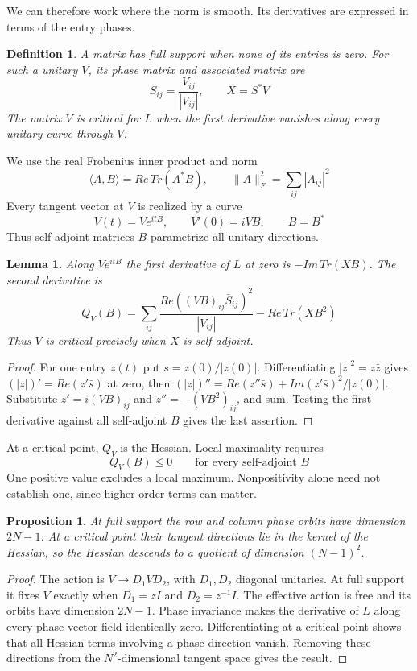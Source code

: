 \documentclass[11pt,a4paper]{article}
\newtheorem{prop}[thm]{Proposition}
\newtheorem{lem}[thm]{Lemma}
\newtheorem{defn}[thm]{Definition}
\begin{document}
We can therefore work where the norm is smooth. Its derivatives are
expressed in terms of the entry phases.

\begin{defn}
A matrix has full support when none of its entries is zero. For such
a unitary $V$, its phase matrix and associated matrix are
\[
 S_{ij}=\frac{V_{ij}}{|V_{ij}|},\qquad X=S^*V
\]
The matrix $V$ is critical for $L$ when the first derivative vanishes
along every unitary curve through $V$.
\end{defn}

We use the real Frobenius inner product and norm
\[
 \langle A,B\rangle=Re\,Tr(A^*B),\qquad
 \|A\|_F^2=\sum_{ij}|A_{ij}|^2
\]
Every tangent vector at $V$ is realized by a curve
\[
 V(t)=Ve^{itB},\qquad V'(0)=iVB,\qquad B=B^*
\]
Thus self-adjoint matrices $B$ parametrize all unitary directions.

\begin{lem}\label{variations}
Along $V e^{itB}$ the first derivative of $L$ at zero is
$-Im\,Tr(XB)$. The second derivative is
\[
 Q_V(B)=\sum_{ij}\frac{Re((VB)_{ij}\bar S_{ij})^2}
 {|V_{ij}|}-Re\,Tr(XB^2)
\]
Thus $V$ is critical precisely when $X$ is self-adjoint.
\end{lem}
\begin{proof}
For one entry $z(t)$ put $s=z(0)/|z(0)|$. Differentiating $|z|^2=z\bar z$
gives $(|z|)'=Re(z'\bar s)$ at zero, then
$(|z|)''=Re(z''\bar s)+Im(z'\bar s)^2/|z(0)|$.
Substitute $z'=i(VB)_{ij}$ and $z''=-(VB^2)_{ij}$, and sum. Testing
the first derivative against all self-adjoint $B$ gives the last assertion.
\end{proof}

At a critical point, $Q_V$ is the Hessian. Local maximality requires
\[
 Q_V(B)\le0\qquad\text{for every self-adjoint }B
\]
One positive value excludes a local maximum. Nonpositivity alone need
not establish one, since higher-order terms can matter.

\begin{prop}\label{phasequotient}
At full support the row and column phase orbits have dimension $2N-1$.
At a critical point their tangent directions lie in the kernel of the
Hessian, so the Hessian descends to a quotient of dimension $(N-1)^2$.
\end{prop}
\begin{proof}
The action is $V\to D_1VD_2$, with $D_1,D_2$ diagonal unitaries.
At full support it fixes $V$ exactly when $D_1=zI$ and $D_2=z^{-1}I$.
The effective action is free and its orbits have dimension $2N-1$.
Phase invariance makes the derivative of $L$ along every phase vector
field identically zero. Differentiating at a critical point shows that
all Hessian terms involving a phase direction vanish. Removing these
directions from the $N^2$-dimensional tangent space gives the result.
\end{proof}
\end{document}
